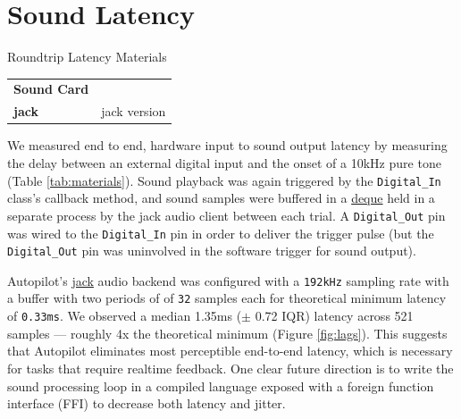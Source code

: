 \section{Sound Latency}
\label{sec:soundlatency}

\begin{margintable}[0cm]
\caption{Roundtrip Latency Materials}
\label{tab:gpiomaterials}
\noindent\begin{tabularx}{\linewidth}{lX}%
\toprule
\textbf{Sound Card} &  \\
\textbf{jack} & jack version
\bottomrule
\end{tabularx}
\end{margintable}

We measured end to end, hardware input to sound output latency by measuring the delay between an external digital input and the onset of a 10kHz pure tone (Table \ref{tab:materials}). Sound playback was again triggered by the \texttt{Digital\_In} class's callback method, and sound samples were buffered in a \href{https://docs.python.org/3/library/collections.html#collections.deque}{deque} held in a separate process by the jack audio client between each trial. A \texttt{Digital\_Out} pin was wired to the \texttt{Digital\_In} pin in order to deliver the trigger pulse (but the \texttt{Digital\_Out} pin was uninvolved in the software trigger for sound output).

Autopilot's \href{http://jackaudio.org/}{jack} audio backend was configured with a \texttt{192kHz} sampling rate with a buffer with two periods of of \texttt{32} samples each for theoretical minimum latency of \texttt{0.33ms}. We observed a median 1.35ms ($\pm$ 0.72 IQR) latency across 521 samples --- roughly 4x the theoretical minimum (Figure \ref{fig:lags}). This suggests that Autopilot eliminates most perceptible end-to-end latency, which is necessary for tasks that require realtime feedback. One clear future direction is to write the sound processing loop in a compiled language exposed with a foreign function interface (FFI) to decrease both latency and jitter.

